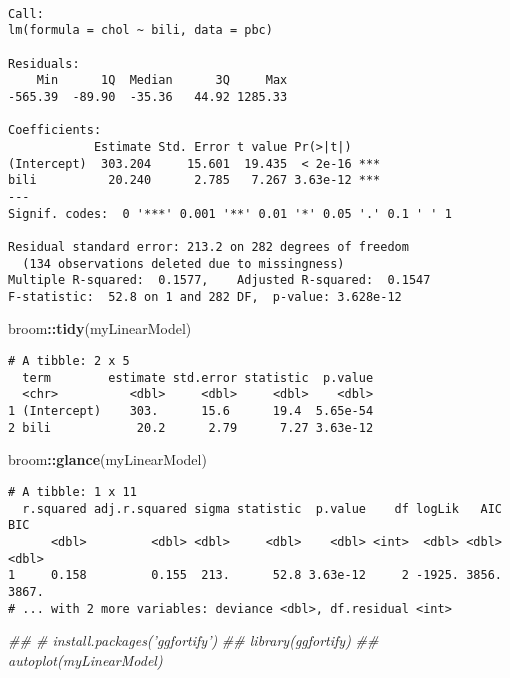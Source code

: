 \documentclass[12pt,letterpaperpaper,openany]{book}
\newenvironment{Shaded}{\begin{snugshade}}{\end{snugshade}}
\newcommand{\CommentTok}[1]{\textcolor[rgb]{0.56,0.35,0.01}{\textit{#1}}}
\newcommand{\KeywordTok}[1]{\textcolor[rgb]{0.13,0.29,0.53}{\textbf{#1}}}
\newcommand{\NormalTok}[1]{#1}
\newcommand{\OperatorTok}[1]{\textcolor[rgb]{0.81,0.36,0.00}{\textbf{#1}}}
\begin{document}
\begin{verbatim}

Call:
lm(formula = chol ~ bili, data = pbc)

Residuals:
    Min      1Q  Median      3Q     Max 
-565.39  -89.90  -35.36   44.92 1285.33 

Coefficients:
            Estimate Std. Error t value Pr(>|t|)    
(Intercept)  303.204     15.601  19.435  < 2e-16 ***
bili          20.240      2.785   7.267 3.63e-12 ***
---
Signif. codes:  0 '***' 0.001 '**' 0.01 '*' 0.05 '.' 0.1 ' ' 1

Residual standard error: 213.2 on 282 degrees of freedom
  (134 observations deleted due to missingness)
Multiple R-squared:  0.1577,    Adjusted R-squared:  0.1547 
F-statistic:  52.8 on 1 and 282 DF,  p-value: 3.628e-12
\end{verbatim}

\begin{Shaded}
\begin{Highlighting}[]
\NormalTok{broom}\OperatorTok{::}\KeywordTok{tidy}\NormalTok{(myLinearModel)}
\end{Highlighting}
\end{Shaded}

\begin{verbatim}
# A tibble: 2 x 5
  term        estimate std.error statistic  p.value
  <chr>          <dbl>     <dbl>     <dbl>    <dbl>
1 (Intercept)    303.      15.6      19.4  5.65e-54
2 bili            20.2      2.79      7.27 3.63e-12
\end{verbatim}

\begin{Shaded}
\begin{Highlighting}[]
\NormalTok{broom}\OperatorTok{::}\KeywordTok{glance}\NormalTok{(myLinearModel)}
\end{Highlighting}
\end{Shaded}

\begin{verbatim}
# A tibble: 1 x 11
  r.squared adj.r.squared sigma statistic  p.value    df logLik   AIC   BIC
      <dbl>         <dbl> <dbl>     <dbl>    <dbl> <int>  <dbl> <dbl> <dbl>
1     0.158         0.155  213.      52.8 3.63e-12     2 -1925. 3856. 3867.
# ... with 2 more variables: deviance <dbl>, df.residual <int>
\end{verbatim}

\begin{Shaded}
\begin{Highlighting}[]
\CommentTok{## # install.packages('ggfortify')}
\CommentTok{## library(ggfortify)}
\CommentTok{## autoplot(myLinearModel)}
\end{Highlighting}
\end{Shaded}
\end{document}
